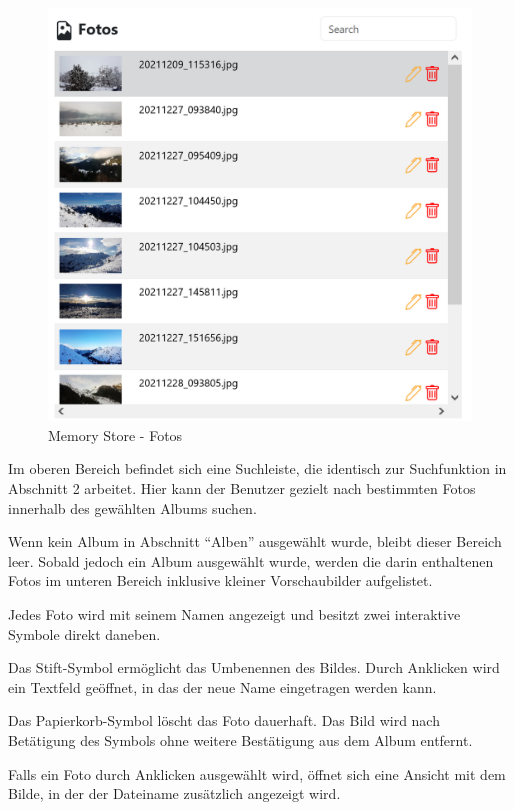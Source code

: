 \begin{figure} [h t]
    \centering
    \includegraphics[scale=0.6]{pics/memory_store_teil3.PNG}
    \caption{Memory Store - Fotos}
    \label{fig:memory-store-fotos}
\end{figure}

Im oberen Bereich befindet sich eine Suchleiste, die identisch zur Suchfunktion in 
Abschnitt 2 arbeitet. Hier kann der Benutzer gezielt nach bestimmten Fotos innerhalb 
des gewählten Albums suchen.

Wenn kein Album in Abschnitt ``Alben'' ausgewählt wurde, bleibt dieser Bereich leer. 
Sobald jedoch ein Album ausgewählt wurde, werden die darin enthaltenen Fotos im 
unteren Bereich inklusive kleiner Vorschaubilder aufgelistet.

Jedes Foto wird mit seinem Namen angezeigt und besitzt zwei interaktive Symbole direkt 
daneben.

Das Stift-Symbol ermöglicht das Umbenennen des Bildes. Durch Anklicken wird ein Textfeld 
geöffnet, in das der neue Name eingetragen werden kann.

Das Papierkorb-Symbol löscht das Foto dauerhaft. Das Bild wird nach Betätigung des Symbols 
ohne weitere Bestätigung aus dem Album entfernt.

Falls ein Foto durch Anklicken ausgewählt wird, öffnet sich eine Ansicht mit dem Bilde, 
in der der Dateiname zusätzlich angezeigt wird. 

